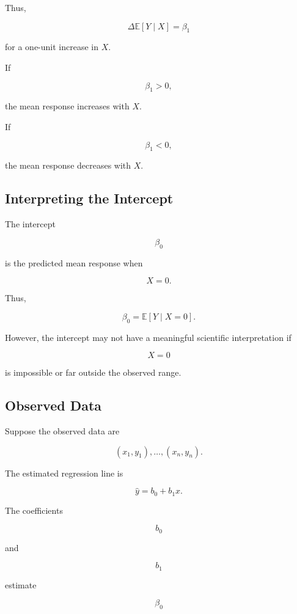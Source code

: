 Thus,

\[
\boxed{
\Delta
\mathbb{E}[Y\mid X]
=
\beta_1
}
\]

for a one-unit increase in \(X\).

If

\[
\beta_1>0,
\]

the mean response increases with \(X\).

If

\[
\beta_1<0,
\]

the mean response decreases with \(X\).

\subsection{Interpreting the Intercept}
\label{subsec:interpreting-regression-intercept}

The intercept

\[
\beta_0
\]

is the predicted mean response when

\[
X=0.
\]

Thus,

\[
\boxed{
\beta_0
=
\mathbb{E}[Y\mid X=0].
}
\]

However, the intercept may not have a meaningful scientific
interpretation if

\[
X=0
\]

is impossible or far outside the observed range.

\subsection{Observed Data}
\label{subsec:observed-regression-data}

Suppose the observed data are

\[
(x_1,y_1),
\ldots,
(x_n,y_n).
\]

The estimated regression line is

\[
\boxed{
\widehat{y}
=
b_0+b_1x.
}
\]

The coefficients

\[
b_0
\]

and

\[
b_1
\]

estimate

\[
\beta_0
\]

